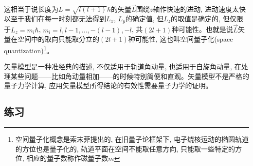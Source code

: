 这相当于说长度为$L = \sqrt{l (l+1)} \hbar$的矢量$\vec
L$围绕$z$轴作快速的进动,
进动速度太快以至于我们在每一时刻都无法得到$L_x$, $L_y$的确定值,
但$L_z$的取值是确定的, 但仅限于$L_z = m_l \hbar$, $m_l = l, l-1,
..., -(l-1), -l$, 共$(2l+1)$种可能性。也就是说$\vec
L$矢量在空间中的取向只能取分立的$(2l+1)$种可能性,
这也叫空间量子化(space
quantization)\footnote{空间量子化概念是索末菲提出的,
在旧量子论框架下, 电子绕核运动的椭圆轨道的方位也是量子化的,
轨道平面在空间不能取任意方向, 只能取一些特定的方位,
相应的量子数称作磁量子数$m$}。


矢量模型是一种准经典的描述, 不仅适用于轨道角动量,
也适用于自旋角动量,
在处理某些问题——比如角动量相加——的时候特别简便和直观。矢量模型不是严格的量子力学计算,
应用矢量模型所得结论的有效性需要量子力学的证明。

\subsection*{练习}

